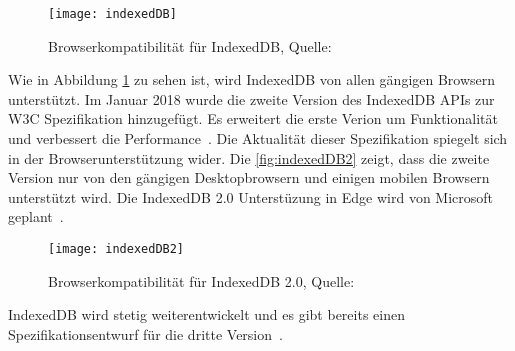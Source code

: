 \begin{figure}[H]
	\centering
	\texttt{[image: indexedDB]}
	\grayRule
	\caption[Browserkompatibilität für IndexedDB]{Browserkompatibilität für IndexedDB, Quelle: ~\cite{caniuse-idb}}
	\label{fig:indexedDB}
\end{figure}
Wie in Abbildung \ref{fig:indexedDB} zu sehen ist, wird IndexedDB von allen gängigen Browsern unterstützt. 
%
Im Januar 2018 wurde die zweite Version des IndexedDB \glspl{API} zur W3C Spezifikation hinzugefügt. Es erweitert die erste Verion um Funktionalität und verbessert die Performance~\cite{idb2}.
Die Aktualität dieser Spezifikation spiegelt sich in der Browserunterstützung wider. Die \autoref{fig:indexedDB2} zeigt, dass die zweite Version nur von den gängigen Desktopbrowsern und einigen mobilen Browsern unterstützt wird. Die IndexedDB 2.0 Unterstüzung in Edge wird von Microsoft geplant~\cite{edge}.
\begin{figure}[H]
	\centering
	\texttt{[image: indexedDB2]}
	\grayRule
	\caption[Browserkompatibilität für IndexedDB 2.0]{Browserkompatibilität für IndexedDB 2.0, Quelle: ~\cite{caniuse-idb}}
	\label{fig:indexedDB2}
\end{figure}
IndexedDB wird stetig weiterentwickelt und es gibt bereits einen Spezifikationsentwurf für die dritte Version~\cite{idb3}. 